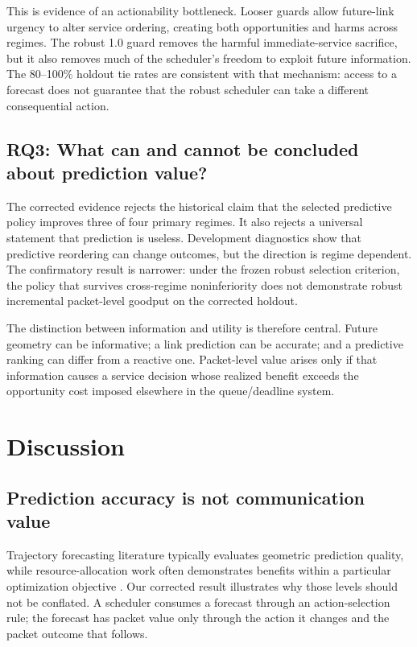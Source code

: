 \documentclass[conference]{IEEEtran}
\begin{document}
This is evidence of an actionability bottleneck. Looser guards allow future-link urgency to alter service ordering, creating both opportunities and harms across regimes. The robust 1.0 guard removes the harmful immediate-service sacrifice, but it also removes much of the scheduler's freedom to exploit future information. The 80--100\% holdout tie rates are consistent with that mechanism: access to a forecast does not guarantee that the robust scheduler can take a different consequential action.

\subsection{RQ3: What can and cannot be concluded about prediction value?}
The corrected evidence rejects the historical claim that the selected predictive policy improves three of four primary regimes. It also rejects a universal statement that prediction is useless. Development diagnostics show that predictive reordering can change outcomes, but the direction is regime dependent. The confirmatory result is narrower: under the frozen robust selection criterion, the policy that survives cross-regime noninferiority does not demonstrate robust incremental packet-level goodput on the corrected holdout.

The distinction between information and utility is therefore central. Future geometry can be informative; a link prediction can be accurate; and a predictive ranking can differ from a reactive one. Packet-level value arises only if that information causes a service decision whose realized benefit exceeds the opportunity cost imposed elsewhere in the queue/deadline system.

\section{Discussion}
\subsection{Prediction accuracy is not communication value}
Trajectory forecasting literature typically evaluates geometric prediction quality, while resource-allocation work often demonstrates benefits within a particular optimization objective \cite{gao2023imm,hajrasouliha2021trajectory,guo2022trajectoryoffload,lu2024predictive}. Our corrected result illustrates why those levels should not be conflated. A scheduler consumes a forecast through an action-selection rule; the forecast has packet value only through the action it changes and the packet outcome that follows.
\end{document}
